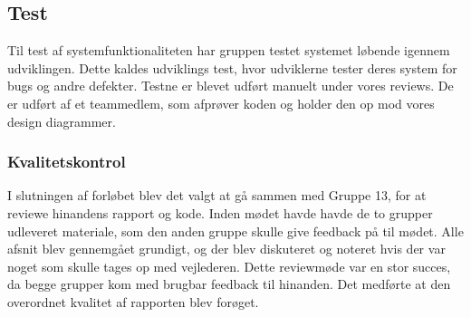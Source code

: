 \documentclass[../../main.tex]{subfiles}
\begin{document}
\subsection{Test}
Til test af systemfunktionaliteten har gruppen testet systemet løbende igennem udviklingen. Dette kaldes udviklings test, hvor udviklerne tester deres system for bugs og andre defekter. Testne er blevet udført manuelt under vores reviews. De er udført af et teammedlem, som afprøver koden og holder den op mod vores design diagrammer. 

\subsubsection{Kvalitetskontrol}
I slutningen af forløbet blev det valgt at gå sammen med Gruppe 13, for at reviewe hinandens rapport og kode. Inden mødet havde havde de to grupper udleveret materiale, som den anden gruppe skulle give feedback på til mødet. Alle afsnit blev gennemgået grundigt, og der blev diskuteret og noteret hvis der var noget som skulle tages op med vejlederen. Dette reviewmøde var en stor succes, da begge grupper kom med brugbar feedback til hinanden. 
Det medførte at den overordnet kvalitet af rapporten blev forøget.                 
\end{document}
